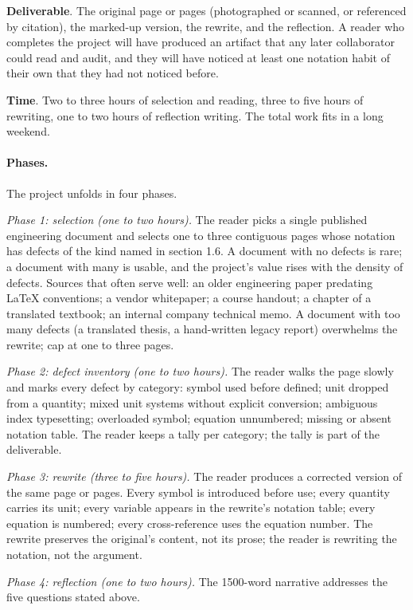 \begin{project}
\textbf{Deliverable}. The original page or pages (photographed or
scanned, or referenced by citation), the marked-up version, the
rewrite, and the reflection. A reader who completes the project
will have produced an artifact that any later collaborator could
read and audit, and they will have noticed at least one notation
habit of their own that they had not noticed before.

\textbf{Time}. Two to three hours of selection and reading, three
to five hours of rewriting, one to two hours of reflection writing.
The total work fits in a long weekend.

\paragraph{Phases.}
The project unfolds in four phases.

\textit{Phase 1: selection (one to two hours).} The reader picks a
single published engineering document and selects one to three
contiguous pages whose notation has defects of the kind named in
section 1.6. A document with no defects is rare; a document with
many is usable, and the project's value rises with the density of
defects. Sources that often serve well: an older engineering paper
predating LaTeX conventions; a vendor whitepaper; a course handout;
a chapter of a translated textbook; an internal company technical
memo. A document with too many defects (a translated thesis, a
hand-written legacy report) overwhelms the rewrite; cap at one to
three pages.

\textit{Phase 2: defect inventory (one to two hours).} The reader
walks the page slowly and marks every defect by category: symbol
used before defined; unit dropped from a quantity; mixed unit
systems without explicit conversion; ambiguous index typesetting;
overloaded symbol; equation unnumbered; missing or absent notation
table. The reader keeps a tally per category; the tally is part of
the deliverable.

\textit{Phase 3: rewrite (three to five hours).} The reader produces
a corrected version of the same page or pages. Every symbol is
introduced before use; every quantity carries its unit; every
variable appears in the rewrite's notation table; every equation is
numbered; every cross-reference uses the equation number. The
rewrite preserves the original's content, not its prose; the reader
is rewriting the notation, not the argument.

\textit{Phase 4: reflection (one to two hours).} The 1500-word
narrative addresses the five questions stated above.


\end{project}
